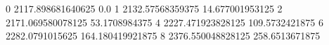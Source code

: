 0 2117.898681640625 0.0
1 2132.57568359375 14.677001953125
2 2171.069580078125 53.1708984375
4 2227.471923828125 109.5732421875
6 2282.0791015625 164.180419921875
8 2376.550048828125 258.6513671875
